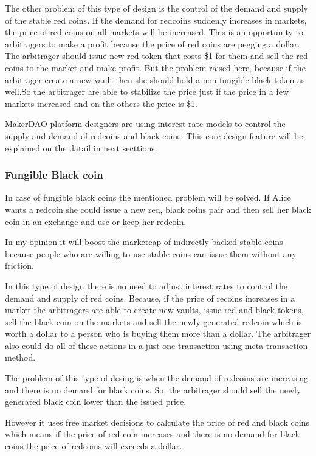 The other problem of this type of design is the control of the demand and supply of the stable red coins. If the demand for redcoins suddenly increases in markets, the price of red coins on all markets will be increased. This is an opportunity to arbitragers to make a profit because the price of red coins are pegging a dollar. The arbitrager should issue new red token that costs \$1 for them and sell the red coins to the market and make profit. But the problem raised here, because if the arbitrager create a new vault then she should hold a non-fungible black token as well.So the arbitrager are able to stabilize the price just if the price in a few markets increased and on the others the price is \$1.

MakerDAO platform designers are using interest rate models to control the supply and demand of redcoins and black coins. This core design feature will be explained on the datail in next secttions.

\subsubsection{Fungible Black coin}

In case of fungible black coins the mentioned problem will be solved. If Alice wants a redcoin she could issue a new red, black coins pair and then sell her black coin in an exchange and use or keep her redcoin.

In my opinion it will boost the marketcap of indirectly-backed stable coins because people who are willing to use stable coins can issue them without any friction.

In this type of design there is no need to adjust interest rates to control the demand and supply of red coins. Because, if the price of recoins increases in a market the arbitragers are able to create new vaults, issue red and black tokens, sell the black coin on the markets and sell the newly generated redcoin which is worth a dollar to a person who is buying them more than a dollar. The arbitrager also could do all of these actions in a just one transaction using meta transaction method.

The problem of this type of desing is when the demand of redcoins are increasing and there is no demand for black coins. So, the arbitrager should sell the newly generated black coin lower than the issued price.

However it uses free market decisions to calculate the price of red and black coins which means if the price of red coin increases and there is no demand for black coins the price of redcoins will exceeds a dollar. 

